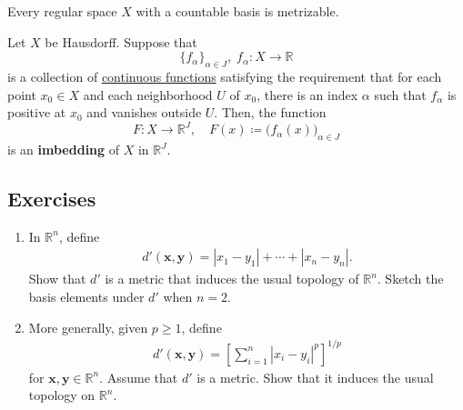   \begin{theorem}
    \label{thm:urysohn-metrization-theorem}
    Every regular space $X$ with a countable basis is metrizable. 
  \end{theorem}

  \begin{theorem}
    \label{thm:imbedding-theorem}
    Let $X$ be Hausdorff. Suppose that 
    \begin{equation}
      \{f_\alpha\}_{\alpha \in J}, \; f_\alpha: X \to \mathbb{R}
    \end{equation}
    is a collection of \hyperref[def:continuous_func]{continuous functions} satisfying the requirement that for each point $x_0 \in X$ and each neighborhood $U$ of $x_0$, there is an index $\alpha$ such that $f_\alpha$ is positive at $x_0$ and vanishes outside $U$. Then, the function 
    \begin{equation}
      F: X \to \mathbb{R}^J, \quad F(x) \coloneqq \big( f_\alpha (x)\big)_{\alpha \in J}
    \end{equation}
    is an \textbf{imbedding} of $X$ in $\mathbb{R}^J$.
  \end{theorem}

\subsection{Exercises}

  \begin{exercise}[Munkres 20.1]
    \begin{enumerate} 
      \item[(a)] In $\mathbb{R}^n$, define
      \begin{align*}
        d'(\mathbf{x}, \mathbf{y}) = |x_1 - y_1| + \cdots + |x_n - y_n|.
      \end{align*}
      Show that $d'$ is a metric that induces the usual topology of $\mathbb{R}^n$. Sketch the basis elements under $d'$ when $n = 2$.
      
      \item[(b)] More generally, given $p \geq 1$, define
      \begin{align*}
        d'(\mathbf{x}, \mathbf{y}) = \left[\sum_{i=1}^{n} |x_i - y_i|^p\right]^{1/p}
      \end{align*}
      for $\mathbf{x}, \mathbf{y} \in \mathbb{R}^n$. Assume that $d'$ is a metric. Show that it induces the usual topology on $\mathbb{R}^n$.
    \end{enumerate}
  \end{exercise}

